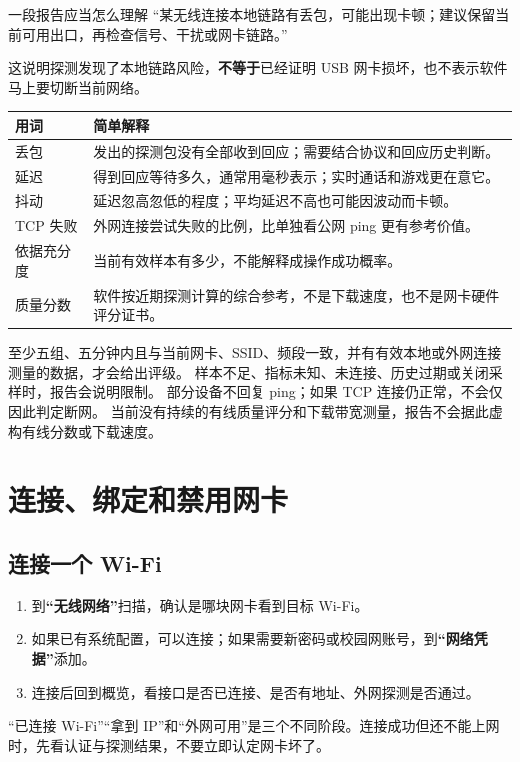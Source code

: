 \documentclass[UTF8,fontset=fandol,11pt,a4paper]{ctexart}
\newcommand{\ui}[1]{\textbf{“#1”}}
\begin{document}
\begin{guidebox}{一段报告应当怎么理解}
“某无线连接本地链路有丢包，可能出现卡顿；建议保留当前可用出口，再检查信号、干扰或网卡链路。”

这说明探测发现了本地链路风险，\textbf{不等于}已经证明 USB 网卡损坏，也不表示软件马上要切断当前网络。
\end{guidebox}

\begin{tabularx}{\linewidth}{@{}p{27mm}X@{}}
\toprule
用词 & 简单解释\\
\midrule
丢包 & 发出的探测包没有全部收到回应；需要结合协议和回应历史判断。\\
延迟 & 得到回应等待多久，通常用毫秒表示；实时通话和游戏更在意它。\\
抖动 & 延迟忽高忽低的程度；平均延迟不高也可能因波动而卡顿。\\
TCP 失败 & 外网连接尝试失败的比例，比单独看公网 ping 更有参考价值。\\
依据充分度 & 当前有效样本有多少，不能解释成操作成功概率。\\
质量分数 & 软件按近期探测计算的综合参考，不是下载速度，也不是网卡硬件评分证书。\\
\bottomrule
\end{tabularx}

至少五组、五分钟内且与当前网卡、SSID、频段一致，并有有效本地或外网连接测量的数据，才会给出评级。
样本不足、指标未知、未连接、历史过期或关闭采样时，报告会说明限制。
部分设备不回复 ping；如果 TCP 连接仍正常，不会仅因此判定断网。
当前没有持续的有线质量评分和下载带宽测量，报告不会据此虚构有线分数或下载速度。

\section{连接、绑定和禁用网卡}
\subsection{连接一个 Wi-Fi}
\begin{enumerate}
\item 到\ui{无线网络}扫描，确认是哪块网卡看到目标 Wi-Fi。
\item 如果已有系统配置，可以连接；如果需要新密码或校园网账号，到\ui{网络凭据}添加。
\item 连接后回到概览，看接口是否已连接、是否有地址、外网探测是否通过。
\end{enumerate}
“已连接 Wi-Fi”“拿到 IP”和“外网可用”是三个不同阶段。连接成功但还不能上网时，先看认证与探测结果，不要立即认定网卡坏了。
\end{document}
